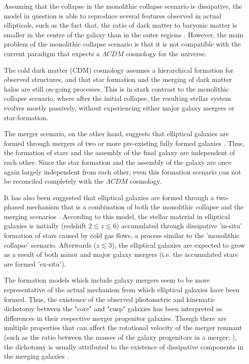 \documentclass[english, oneside]{HYgradu}
\begin{document}
Assuming that the collapse in the monolithic collapse scenario is dissipative, the model in question is able to reproduce several features observed in actual ellipticals, such as the fact that, the ratio of dark matter to baryonic matter is smaller in the centre of the galaxy than in the outer regions \citep{GalaxyFormationAndEvo2010}. However, the main problem of the monolithic collapse scenario is that it is not compatible with the current paradigm that expects a $\Lambda CDM$ cosmology for the universe. 

The cold dark matter (CDM) cosmology assumes a hierarchical formation for observed structures, and that star formation and the merging of dark matter halos are still on-going processes. This is in stark contrast to the monolithic collapse scenario, where after the initial collapse, the resulting stellar system evolves mostly passively, without experiencing either major galaxy mergers or star-formation.

The merger scenario, on the other hand, suggests that elliptical galaxies are formed through mergers of two or more pre-existing fully formed galaxies \citep{GalaxyFormationAndEvo2010}. Thus, the formation of stars and the assembly of the final galaxy are independent of each other. Since the star formation and the assembly of the galaxy are once again largely independent from each other, even this formation scenario can not be reconciled completely with the $\Lambda CDM$ cosmology.

It has also been suggested that elliptical galaxies are formed through a two-phased mechanism that is a combination of both the monolithic collapse and the merging scenarios \citep[e.g.][]{Oser2010}. According to this model, the stellar material in elliptical galaxies is initially (redshift $2 \lesssim z \lesssim 6$) accumulated through dissipative 'in-situ' formation of stars caused by cold gas flows, a process similar to the 'monolithic collapse' scenario. Afterwards ($z \lesssim 3$), the elliptical galaxies are expected to grow as a result of both minor and major galaxy mergers (i.e. the accumulated stars are formed 'ex-situ'). 

The formation models which include galaxy mergers seem to be more representative of the actual mechanism from which elliptical galaxies have been formed. Thus, the existence of the observed photometric and kinematic dichotomy between the "core" and "cusp" galaxies has been interpreted as differences in their respective merger progenitor galaxies. Though there are multiple properties that can affect the rotational velocity of the merger remnant (such as the ratio between the masses of the galaxy progenitors in a merger; \citealt{Naab2003}), the dichotomy is usually attributed to the existence of dissipative components in the merging galaxies \citep{GalaxyFormationAndEvo2010}.
\end{document}
